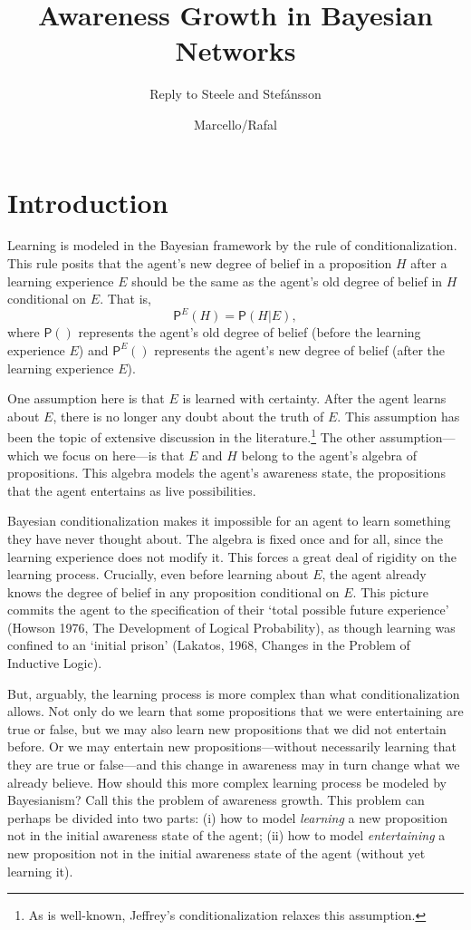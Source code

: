 \documentclass[
  11pt,
  dvipsnames,enabledeprecatedfontcommands]{scrartcl}
\title{Awareness Growth in Bayesian Networks}
\subtitle{Reply to Steele and Stefánsson}
\author{Marcello/Rafal}
\date{}
\newcommand{\pr}[1]{\ensuremath{\mathsf{P}(#1)}}
\newcommand{\ppr}[2]{\ensuremath{\mathsf{P}^{#1}(#2)}}
\begin{document}
\maketitle

\hypertarget{introduction}{%
\section{Introduction}\label{introduction}}

Learning is modeled in the Bayesian framework by the rule of
conditionalization. This rule posits that the agent's new degree of
belief in a proposition \(H\) after a learning experience \(E\) should
be the same as the agent's old degree of belief in \(H\) conditional on
\(E\). That is, \[\ppr{E}{H}=\pr{H \vert E},\] where \(\pr{}\)
represents the agent's old degree of belief (before the learning
experience \(E\)) and \(\ppr{E}{}\) represents the agent's new degree of
belief (after the learning experience \(E\)).

One assumption here is that \(E\) is learned with certainty. After the
agent learns about \(E\), there is no longer any doubt about the truth
of \(E\). This assumption has been the topic of extensive discussion in
the literature.\footnote{As is well-known, Jeffrey's conditionalization
  relaxes this assumption.} The other assumption---which we focus on
here---is that \(E\) and \(H\) belong to the agent's algebra of
propositions. This algebra models the agent's awareness state, the
propositions that the agent entertains as live possibilities.

Bayesian conditionalization makes it impossible for an agent to learn
something they have never thought about. The algebra is fixed once and
for all, since the learning experience does not modify it. This forces a
great deal of rigidity on the learning process. Crucially, even before
learning about \(E\), the agent already knows the degree of belief in
any proposition conditional on \(E\). This picture commits the agent to
the specification of their `total possible future experience' (Howson
1976, The Development of Logical Probability), as though learning was
confined to an `initial prison' (Lakatos, 1968, Changes in the Problem
of Inductive Logic).

But, arguably, the learning process is more complex than what
conditionalization allows. Not only do we learn that some propositions
that we were entertaining are true or false, but we may also learn new
propositions that we did not entertain before. Or we may entertain new
propositions---without necessarily learning that they are true or
false---and this change in awareness may in turn change what we already
believe. How should this more complex learning process be modeled by
Bayesianism? Call this the problem of awareness growth. This problem can
perhaps be divided into two parts: (i) how to model \textit{learning} a
new proposition not in the initial awareness state of the agent; (ii)
how to model \textit{entertaining} a new proposition not in the initial
awareness state of the agent (without yet learning it).
\end{document}
